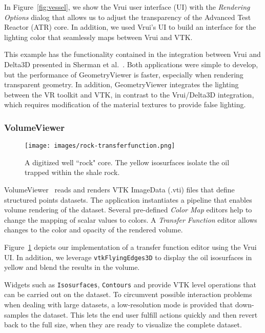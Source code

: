 In Figure~\ref{fig:vessel}, we show the Vrui user interface (UI) with the \textit{Rendering Options} dialog that allows us to adjust the transparency of the Advanced Test Reactor (ATR) core. In addition, we used Vrui's UI to build an interface for the lighting color that seamlessly maps between Vrui and VTK.

This example has the functionality contained in the integration between Vrui and Delta3D presented in Sherman et al.~\cite{Sherman:2010}. Both applications were simple to develop, but the performance of GeometryViewer is faster, especially when rendering transparent geometry. In addition, GeometryViewer integrates the lighting between the VR toolkit and VTK, in contrast to the Vrui/Delta3D integration, which requires modification of the material textures to provide false lighting.

\subsubsection{VolumeViewer}

\begin{figure}[h!]
 \centering
 \texttt{[image: images/rock-transferfunction.png]}
 \caption{A digitized well ``rock" core. The yellow isosurfaces isolate the oil trapped within the shale rock.}
 \label{fig:volume}
\end{figure}

VolumeViewer~\cite{VolumeViewer} reads and renders VTK ImageData (.vti) files that define structured points datasets.  The application instantiates a pipeline that enables volume rendering of the dataset. Several pre-defined \textit{Color Map} editors help to change the mapping of scalar values to colors. A  \textit{Transfer Function} editor allows changes to the color and opacity of the rendered volume.

Figure~\ref{fig:volume} depicts our implementation of a transfer function editor using the Vrui UI. In addition, we leverage \texttt{vtkFlyingEdges3D} to display the oil isosurfaces in yellow and blend the results in the volume.

Widgets such as \texttt{Isosurfaces}, \texttt{Contours} and  provide VTK level operations that can be carried out on the dataset. To circumvent possible interaction problems when dealing with large datasets, a low-resolution mode is provided that down-samples the dataset. This lets the end user fulfill actions quickly and then revert back to the full size, when they are ready to visualize the complete dataset.

